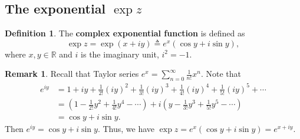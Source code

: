 \documentclass[12pt,openany]{book}
\theoremstyle{definition}
\newtheorem{definition}{Definition}[chapter]
\newtheorem{remark}{Remark}[section]
\newcommand{\R}{\mathbb{R}}
\newcommand{\of}[1]{\left( #1 \right)}
\begin{document}
	\subsection{The exponential $\exp z$}
	\begin{tcolorbox}[colback=white,colframe=defcolor,arc=5pt,title={\color{white}\bf Complex Exponential}]
		\begin{definition}
			The \textbf{complex exponential function} is defined as
			\begin{equation*}
				\exp{z} =\exp{(x+iy)} \triangleq e^{x}(\cos y + i\sin y),
			\end{equation*}
			where $x,y\in\R$ and $i$ is the imaginary unit, $i^2=-1$.
		\end{definition}
	\end{tcolorbox}
	\begin{remark}
		Recall that Taylor series $e^x=\sum_{n=0}^\infty\frac{1}{n!}x^n$. Note that \begin{align*}
			e^{iy}&=1+iy+\frac{1}{2!}(iy)^2+\frac{1}{3!}(iy)^3+\frac{1}{4!}(iy)^4+\frac{1}{5!}(iy)^5+\cdots\\
			&=\of{1-\frac{1}{2!}y^2+\frac{1}{4!}y^4-\cdots}+i\of{y-\frac{1}{3!}y^3+\frac{1}{5!}y^5-\cdots}\\
			&=\cos y+i\sin y.
		\end{align*} Then $e^{iy}=\cos y+i\sin y$. Thus, we have $
		\exp z=e^x(\cos y+i\sin y)=e^{x+iy}.
		$
	\end{remark}
	
\end{document}
